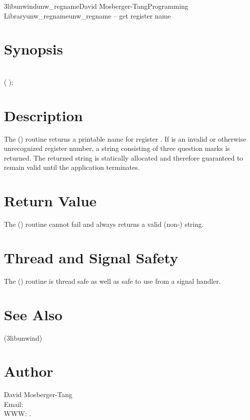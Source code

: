 \documentclass{article}
\begin{document}
\begin{Name}{3libunwind}{unw\_regname}{David Mosberger-Tang}{Programming Library}{unw\_regname}unw\_regname -- get register name
\end{Name}

\section{Synopsis}

\\

( );\\

\section{Description}

The () routine returns a printable name for
register .  If  is an invalid or otherwise
unrecognized register number, a string consisting of three question
marks is returned.  The returned string is statically allocated and
therefore guaranteed to remain valid until the application terminates.

\section{Return Value}

The () routine cannot fail and always returns a
valid (non-) string.

\section{Thread and Signal Safety}

The () routine is thread safe as well as safe to
use from a signal handler.

\section{See Also}

(3libunwind)

\section{Author}

\noindent
David Mosberger-Tang\\
Email: \\
WWW: .
\LatexManEnd
\end{document}
